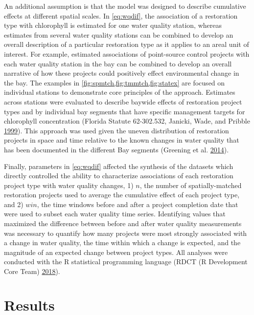 \documentclass[]{article}
\begin{document}
An additional assumption is that the model was designed to describe
cumulative effects at different spatial scales. In \cref{eq:wqdif}, the
association of a restoration type with chlorophyll is estimated for one
water quality station, whereas estimates from several water quality
stations can be combined to develop an overall description of a
particular restoration type as it applies to an areal unit of interest.
For example, estimated associations of point-source control projects
with each water quality station in the bay can be combined to develop an
overall narrative of how these projects could positively effect
environmental change in the bay. The examples in
\cref{fig:spmtch,fig:tmmtch,fig:statex} are focused on individual
stations to demonstrate core principles of the approach. Estimates
across stations were evaluated to describe baywide effects of
restoration project types and by individual bay segments that have
specific management targets for chlorophyll concentration (Florida
Statute 62-302.532, Janicki, Wade, and Pribble
\protect\hyperlink{ref-Janicki99}{1999}). This approach was used given
the uneven distribution of restoration projects in space and time
relative to the known changes in water quality that has been documented
in the different Bay segments (Greening et al.
\protect\hyperlink{ref-Greening2014}{2014}).

Finally, parameters in \cref{eq:wqdif} affected the synthesis of the
datasets which directly controlled the ability to characterize
associations of each restoration project type with water quality
changes, 1) \(n\), the number of spatially-matched restoration projects
used to average the cumulative effect of each project type, and 2)
\(win\), the time windows before and after a project completion date
that were used to subset each water quality time series. Identifying
values that maximized the difference between before and after water
quality measurements was necessary to quantify how many projects were
most strongly associated with a change in water quality, the time within
which a change is expected, and the magnitude of an expected change
between project types. All analyses were conducted with the R
statistical programming language (RDCT (R Development Core Team)
\protect\hyperlink{ref-RDCT18}{2018}).

\hypertarget{results}{%
\section{Results}\label{results}}
\end{document}
